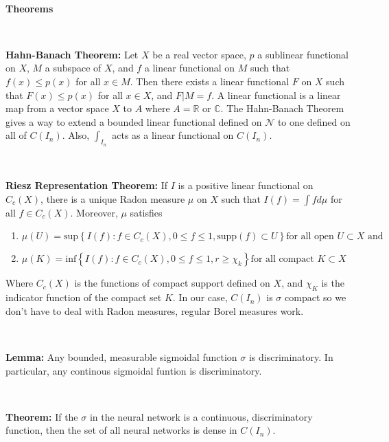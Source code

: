 \documentclass[12 pt]{article}
\theoremstyle{definition}
\newcommand{\C}{\mathbb{C}}
\newcommand{\R}{\mathbb{R}}
\begin{document}
\

\textbf{Theorems}

\

\textbf{Hahn-Banach Theorem:} Let $X$ be a real vector space, $p$ a sublinear functional on $X$, $M$ a subspace of $X$, and $f$ a linear functional on $M$ such that $f(x) \leq p(x)$ for all $x \in M$. Then there exists a linear functional $F$ on $X$ such that $F(x) \leq p(x)$ for all $x \in X$, and $F|M = f$. A linear functional is a linear map from a vector space $X$ to $A$ where $A = \R$ or $\C$. The Hahn-Banach Theorem gives a way to extend a bounded linear functional defined on $\mathcal{N}$ to one defined on all of $C(I_{n})$. Also, $\int_{I_{n}}$ acts as a linear functional on $C(I_{n})$. 

\

\textbf{Riesz Representation Theorem:} If $I$ is a positive linear functional on $C_{c}(X)$, there is a unique Radon measure $\mu$ on $X$ such that $I(f) = \int f d \mu$ for all $f \in C_{c}(X)$. Moreover, $\mu$ satisfies 
\begin{enumerate} 
\item $\mu(U) = \text{sup} \left\{ I(f) : f \in C_{c}(X), 0 \leq f \leq 1, \text{supp}(f) \subset U \right\} \text{for all open $U \subset X$ and}$
\item $\mu(K) = \text{inf} \left\{ I(f) : f \in C_{c}(X), 0 \leq f \leq 1, r \geq \chi_{k} \right\} \text{for all compact $K \subset X$}$
\end{enumerate}
Where $C_{c}(X)$ is the functions of compact support defined on $X$, and $\chi_{K}$ is the indicator function of the compact set $K$. In our case, $C(I_{n})$ is $\sigma$ compact so we don't have to deal with Radon measures, regular Borel measures work. 

\

\textbf{Lemma:} Any bounded, measurable sigmoidal function $\sigma$ is discriminatory. In particular, any continous sigmoidal funtion is discriminatory.

\

\textbf{Theorem:} If the $\sigma$ in the neural network is a continuous, discriminatory function, then the set of all neural networks is dense in $C(I_{n})$. 

\
\end{document}
